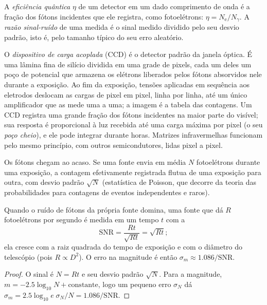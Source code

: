 \begin{definition}\label{def:b1:observing-the-sky:detector}
A \emph{eficiência quântica} $\eta$ de um detector em um dado comprimento de onda é a fração dos fótons incidentes que ele registra, como fotoelétrons: $\eta = N_\mathrm{e}/N_\gamma$. A \emph{razão sinal-ruído} de uma medida é o sinal medido dividido pelo seu desvio padrão, isto é, pelo tamanho típico do seu erro aleatório.
\end{definition}

O \emph{dispositivo de carga acoplada} (CCD) é o detector padrão da janela óptica. É uma lâmina fina de silício dividida em uma grade de pixels, cada um deles um poço de potencial que armazena os elétrons liberados pelos fótons absorvidos nele durante a exposição. Ao fim da exposição, tensões aplicadas em sequência aos eletrodos deslocam as cargas de pixel em pixel, linha por linha, até um único amplificador que as mede uma a uma; a imagem é a tabela das contagens. Um CCD registra uma grande fração dos fótons incidentes na maior parte do visível; sua resposta é proporcional à luz recebida até uma carga máxima por pixel (o seu \emph{poço cheio}), e ele pode integrar durante horas. Matrizes infravermelhas funcionam pelo mesmo princípio, com outros semicondutores, lidas pixel a pixel.

Os fótons chegam ao acaso. Se uma fonte envia em média $N$ fotoelétrons durante uma exposição, a contagem efetivamente registrada flutua de uma exposição para outra, com desvio padrão $\sqrt N$ (estatística de Poisson, que decorre da teoria das probabilidades para contagens de eventos independentes e raros).

\begin{proposition}\label{prop:b1:observing-the-sky:snr}
Quando o ruído de fótons da própria fonte domina, uma fonte que dá $R$ fotoelétrons por segundo é medida em um tempo $t$ com a 
\[
  \mathrm{SNR} = \frac{Rt}{\sqrt{Rt}} = \sqrt{Rt} ;
\]
ela cresce com a raiz quadrada do tempo de exposição e com o diâmetro do telescópio (pois $R \propto D^2$). O erro na magnitude é então
$\sigma_m \approx 1.086/\mathrm{SNR}$.
\end{proposition}

\begin{proof}
O sinal é $N = Rt$ e seu desvio padrão $\sqrt N$. Para a magnitude, $m = -2.5\log_{10}N + \text{constante}$, logo um pequeno erro $\sigma_N$
dá $\sigma_m = 2.5\log_{10}e\;\sigma_N/N = 1.086/\mathrm{SNR}$.
\end{proof}

